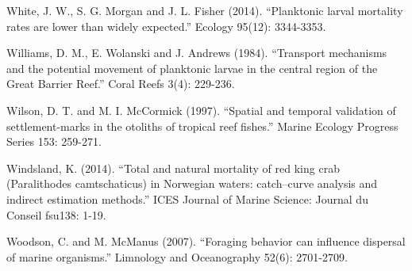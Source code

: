 \documentclass[]{book}
\begin{document}
White, J. W., S. G. Morgan and J. L. Fisher (2014). ``Planktonic larval
mortality rates are lower than widely expected.'' Ecology 95(12):
3344-3353.

Williams, D. M., E. Wolanski and J. Andrews (1984). ``Transport
mechanisms and the potential movement of planktonic larvae in the
central region of the Great Barrier Reef.'' Coral Reefs 3(4): 229-236.

Wilson, D. T. and M. I. McCormick (1997). ``Spatial and temporal
validation of settlement-marks in the otoliths of tropical reef
fishes.'' Marine Ecology Progress Series 153: 259-271.

Windsland, K. (2014). ``Total and natural mortality of red king crab
(Paralithodes camtschaticus) in Norwegian waters: catch--curve analysis
and indirect estimation methods.'' ICES Journal of Marine Science:
Journal du Conseil fsu138: 1-19.

Woodson, C. and M. McManus (2007). ``Foraging behavior can influence
dispersal of marine organisms.'' Limnology and Oceanography 52(6):
2701-2709.


\end{document}
